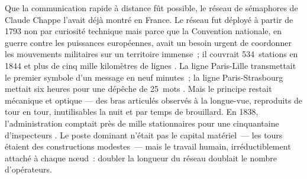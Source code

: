 Que la communication rapide à distance fût possible, le réseau de sémaphores de Claude Chappe l'avait déjà montré en France. Le réseau fut déployé à partir de 1793 non par curiosité technique mais parce que la Convention nationale, en guerre contre les puissances européennes, avait un besoin urgent de coordonner les mouvements militaires sur un territoire immense~; il couvrait 534~stations en 1844 et plus de cinq mille kilomètres de lignes \parencite{holzmann_early_1995, field_french_1994}. La ligne Paris-Lille transmettait le premier symbole d'un message en neuf minutes~; la ligne Paris-Strasbourg mettait six heures pour une dépêche de 25~mots \parencite[p.~87]{holzmann_early_1995}. Mais le principe restait mécanique et optique --- des bras articulés observés à la longue-vue, reproduits de tour en tour, inutilisables la nuit et par temps de brouillard. En 1838, l'administration comptait près de mille stationnaires pour une cinquantaine d'inspecteurs \parencite{ducamp_telegraphe_1869, field_french_1994}. %
Le poste dominant n'était pas le capital matériel~--- les tours étaient des constructions modestes~--- mais le travail humain, irréductiblement attaché à chaque n\oe{}ud~: doubler la longueur du réseau doublait le nombre d'opérateurs.

